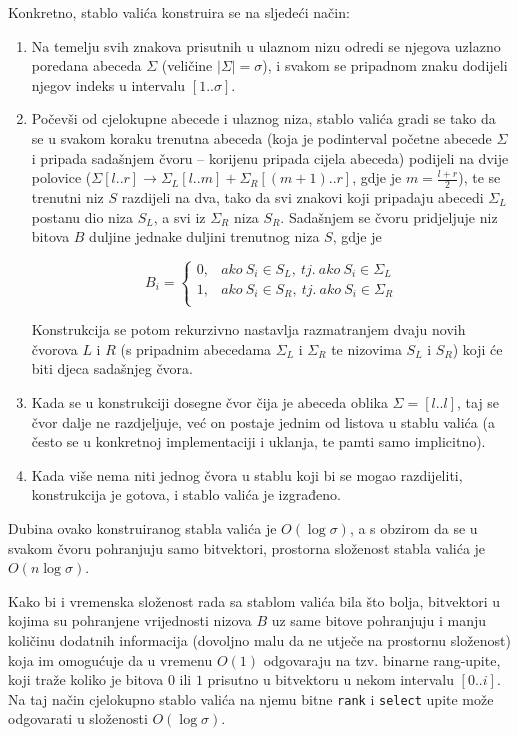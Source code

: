 \documentclass[a4paper,12pt]{article}
\begin{document}
Konkretno, stablo valića konstruira se na sljedeći način:
\begin{enumerate}
	\item Na temelju svih znakova prisutnih u ulaznom nizu odredi se njegova uzlazno poredana abeceda $\Sigma$ (veličine $|\Sigma| = \sigma$), i svakom se pripadnom znaku dodijeli njegov indeks u intervalu $[1..\sigma]$. 
	
	\item Počevši od cjelokupne abecede i ulaznog niza, stablo valića gradi se tako da se u svakom koraku trenutna abeceda (koja je podinterval početne abecede $\Sigma$ i pripada sadašnjem čvoru -- korijenu pripada cijela abeceda) podijeli na dvije polovice ($\Sigma[l..r] \rightarrow \Sigma_L[l..m] + \Sigma_R[(m+1)..r]$, gdje je $m = \frac{l+r}{2}$), te se trenutni niz $S$ razdijeli na dva, tako da svi znakovi koji pripadaju abecedi $\Sigma_L$ postanu dio niza $S_L$, a svi iz $\Sigma_R$ niza $S_R$. Sadašnjem se čvoru pridjeljuje niz bitova $B$ duljine jednake duljini trenutnog niza $S$, gdje je
	
	$$
	B_i =
	\begin{cases}
	0, & ako\ S_i \in S_L,\ tj.\ ako\ S_i \in \Sigma_L \\
	1, & ako\ S_i \in S_R,\ tj.\ ako\ S_i \in \Sigma_R \\
	\end{cases}
	$$
	
	Konstrukcija se potom rekurzivno nastavlja razmatranjem dvaju novih čvorova $L$ i $R$ (s pripadnim abecedama $\Sigma_L$ i $\Sigma_R$ te nizovima $S_L$ i $S_R$) koji će biti djeca sadašnjeg čvora.
	
	\item Kada se u konstrukciji dosegne čvor čija je abeceda oblika $\Sigma = [l..l]$, taj se čvor dalje ne razdjeljuje, već on postaje jednim od listova u stablu valića (a često se u konkretnoj implementaciji i uklanja, te pamti samo implicitno).
	
	\item Kada više nema niti jednog čvora u stablu koji bi se mogao razdijeliti, konstrukcija je gotova, i stablo valića je izgrađeno.
\end{enumerate}

Dubina ovako konstruiranog stabla valića je $O(\log\sigma)$, a s obzirom da se u svakom čvoru pohranjuju samo bitvektori, prostorna složenost stabla valića je $O(n\log\sigma)$.

Kako bi i vremenska složenost rada sa stablom valića bila što bolja, bitvektori u kojima su pohranjene vrijednosti nizova $B$ uz same bitove pohranjuju i manju količinu dodatnih informacija (dovoljno malu da ne utječe na prostornu složenost) koja im omogućuje da u vremenu $O(1)$ odgovaraju na tzv. binarne rang-upite, koji traže koliko je bitova $0$ ili $1$ prisutno u bitvektoru u nekom intervalu $[0..i]$. Na taj način cjelokupno stablo valića na njemu bitne \texttt{rank} i \texttt{select} upite može odgovarati u složenosti $O(\log\sigma)$.
\end{document}
